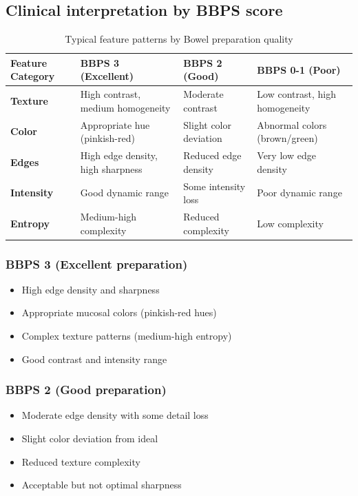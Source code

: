 \documentclass[11pt]{article}
\begin{document}
\subsection{Clinical interpretation by BBPS score}

\begin{table}[H]
\centering
\caption{Typical feature patterns by Bowel preparation quality}
\begin{tabular}{p{3cm}p{4cm}p{4cm}p{4cm}}
\toprule
\textbf{Feature Category} & \textbf{BBPS 3 (Excellent)} & \textbf{BBPS 2 (Good)} & \textbf{BBPS 0-1 (Poor)} \\
\midrule
\textbf{Texture} & High contrast, medium homogeneity & Moderate contrast & Low contrast, high homogeneity \\
\textbf{Color} & Appropriate hue (pinkish-red) & Slight color deviation & Abnormal colors (brown/green) \\
\textbf{Edges} & High edge density, high sharpness & Reduced edge density & Very low edge density \\
\textbf{Intensity} & Good dynamic range & Some intensity loss & Poor dynamic range \\
\textbf{Entropy} & Medium-high complexity & Reduced complexity & Low complexity \\
\bottomrule
\end{tabular}
\end{table}

\subsubsection{BBPS 3 (Excellent preparation)}
\begin{itemize}
    \item High edge density and sharpness
    \item Appropriate mucosal colors (pinkish-red hues)
    \item Complex texture patterns (medium-high entropy)
    \item Good contrast and intensity range
\end{itemize}

\subsubsection{BBPS 2 (Good preparation)}
\begin{itemize}
    \item Moderate edge density with some detail loss
    \item Slight color deviation from ideal
    \item Reduced texture complexity
    \item Acceptable but not optimal sharpness
\end{itemize}
\end{document}
